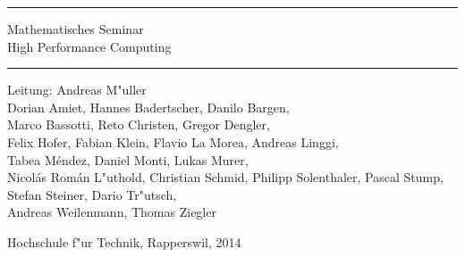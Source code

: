 \documentclass{book}
\begin{document}
\pagestyle{fancy}
\frontmatter
\newcommand\HRule{\noindent\rule{\linewidth}{1.5pt}}
\begin{titlepage}
\HRule
\vspace*{5pt}
\begin{flushright}
{
\LARGE
Mathematisches Seminar\\
\vspace*{20pt}
\Huge
High Performance Computing}
\end{flushright}
\HRule
\begin{flushright}
\vspace{60pt}
\Large
Leitung: Andreas M"uller\\
\vspace{40pt}
\Large
Dorian Amiet,
Hannes Badertscher,
Danilo Bargen,\\
Marco Bassotti,
Reto Christen,
Gregor Dengler,\\
Felix Hofer,
Fabian Klein,
Flavio La Morea,
Andreas Linggi,\\
Tabea M\'endez,
Daniel Monti,
Lukas Murer,\\
Nicol\'as Rom\'an L"uthold,
Christian Schmid,
Philipp Solenthaler,
Pascal Stump,
Stefan Steiner,
Dario Tr"utsch,\\
Andreas Weilenmann,
Thomas Ziegler
\end{flushright}
\begin{center}
Hochschule f"ur Technik, Rapperswil, 2014
\end{center}
\end{titlepage}
\hypersetup{
    colorlinks=true,
    linktoc=all,
    linkcolor=blue
}
\newenvironment{beispiele}{
\bgroup\smallskip\parindent0pt\bf Beispiele\egroup

\begin{list}{\arabic{beispiel}.}
  {\usecounter{beispiel}
  \setlength{\labelsep}{5mm}
  \setlength{\rightmargin}{0pt}
}}{\end{list}}
\newenvironment{uebungsaufgaben}{
\begin{list}{\arabic{uebungsaufgabe}.}
  {\usecounter{uebungsaufgabe}
  \setlength{\labelwidth}{2cm}
  \setlength{\leftmargin}{0pt}
  \setlength{\labelsep}{5mm}
  \setlength{\rightmargin}{0pt}
  \setlength{\itemindent}{0pt}
}}{\end{list}\vfill\pagebreak}
\newenvironment{teilaufgaben}{
\begin{enumerate}
\renewcommand{\labelenumi}{\alph{enumi})}
}{\end{enumerate}}
\def\swallow#1{
}
\newenvironment{loesung}{%
\begin{proof}[L"osung]%
\renewcommand{\qedsymbol}{$\bigcirc$}
}{\end{proof}}
\newenvironment{diskussion}{}{}
\def\keineloesungen{%
\renewenvironment{loesung}{\swallow\begingroup}{\endgroup}%
\renewenvironment{diskussion}{\swallow\begingroup}{\endgroup}%
}
\newenvironment{beispiel}{%
\begin{proof}[Beispiel]%
\renewcommand{\qedsymbol}{$\bigcirc$}
}{\end{proof}}
\end{document}
